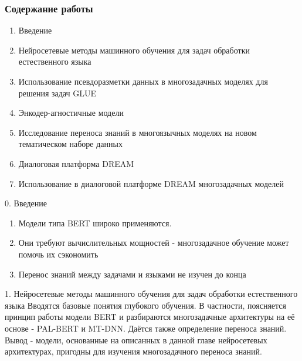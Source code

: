 \begin{frame}
\frametitle{Содержание работы}
\begin{enumerate}
    \item {Введение}
    \item {Нейросетевые методы машинного обучения для задач обработки естественного языка}
    \item {Использование псевдоразметки данных в многозадачных моделях для решения задач GLUE}
    \item {Энкодер-агностичные модели}
    \item {Исследование переноса знаний в многоязычных моделях на новом тематическом наборе данных}
    \item {Диалоговая платформа DREAM}
    \item {Использование в диалоговой платформе {DREAM} многозадачных моделей}
\end{enumerate}
\end{frame}

\begin{frame}{0. Введение}
\begin{enumerate}
\item Модели типа BERT широко применяются.
\item Они требуют вычислительных мощностей - многозадачное обучение может помочь их сэкономить
\item Перенос знаний между задачами и языками не изучен до конца
\end{enumerate}
\end{frame}

\begin{frame}{1. Нейросетевые методы машинного обучения  для задач обработки естественного языка}
Вводятся базовые понятия глубокого обучения. В частности, поясняется принцип работы модели BERT и разбираются многозадачные архитектуры на её основе - PAL-BERT и MT-DNN. Даётся также определение переноса знаний.
\newline
\newline
Вывод - модели, основанные на описанных в данной главе нейросетевых архитектурах, пригодны для изучения многозадачного переноса знаний.
\end{frame}


